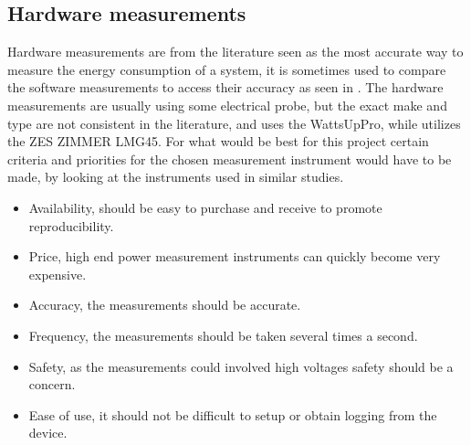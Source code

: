 \subsection{Hardware measurements} \label{sec:clampIntro}
Hardware measurements are from the literature seen as the most accurate way to measure the energy consumption of a system, it is sometimes used to compare the software measurements to access their accuracy as seen in \cite{fahad2019comparative}. The hardware measurements are usually using some electrical probe, but the exact make and type are not consistent in the literature, \cite{Pereira2017} and \cite{fahad2019comparative} uses the WattsUpPro, while \cite{hackenberg2013} utilizes the ZES ZIMMER LMG45. For what would be best for this project certain criteria and priorities for the chosen measurement instrument would have to be made, by looking at the instruments used in similar studies.
\begin{itemize}
    \item Availability, should be easy to purchase and receive to promote reproducibility.
    \item Price, high end power measurement instruments can quickly become very expensive.
    \item Accuracy, the measurements should be accurate.
    \item Frequency, the measurements should be taken several times a second.
    \item Safety, as the measurements could involved high voltages safety should be a concern.
    \item Ease of use, it should not be difficult to setup or obtain logging from the device.
\end{itemize}


